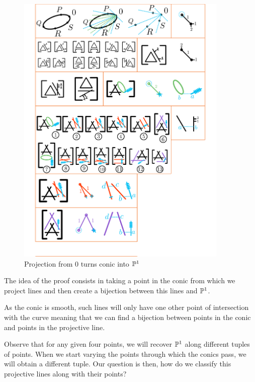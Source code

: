 \documentclass[12pt]{memoir}
\begin{document}
\begin{figure}[h!]
        \centering
        \includegraphics[width=0.9\textwidth, trim= 1.32cm 24.6cm 5.2cm 0.1cm,clip]{../figs/FigsDNnotability3.pdf}
        \caption{Projection from $0$ turns conic into $\mathbb{P}^1$}
        \label{fig:smooth-conic-into-P1}
    \end{figure}
\begin{ptcb}

    The idea of the proof consists in taking a point in the conic from which we project lines and then create a bijection between this lines and $\mathbb{P}^1$.\par
    As the conic is smooth, such lines will only have one other point of intersection with the curve meaning that we can find a bijection between points in the conic and points in the projective line.
\end{ptcb}

\begin{Rmk}
Observe that for any given four points, we will recover $\mathbb{P}^1$ along different tuples of points. When we start varying the points through which the conics pass, we will obtain a different tuple. Our question is then, how do we classify this projective lines along with their points?
\end{Rmk}
\end{document}
